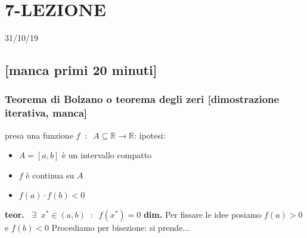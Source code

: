 \section*{7-LEZIONE}
31/10/19
\subsection*{[manca primi 20 minuti]}
\subsubsection*{Teorema di Bolzano o teorema degli zeri [dimostrazione iterativa, manca]}
presa una funzione $f \;\;:\;\; A \subseteq \mathbb{R} \longrightarrow \mathbb{R}$:\newline
ipotesi:
\begin{itemize}
    \item $A=[a,b]$ è un intervallo compatto
    \item $f$ è continua su $A$
    \item $f(a) \cdot  f(b) < 0$ 
\end{itemize}
\textbf{teor.} $\;\;\exists\;\; x^* \in (a,b) \;\;:\;\; f(x^*)=0$\newline
\newline
\textbf{dim.} Per fissare le idee posiamo $f(a)>0$ e $f(b)<0$\newline
Procediamo per bisezione: si prende... 
